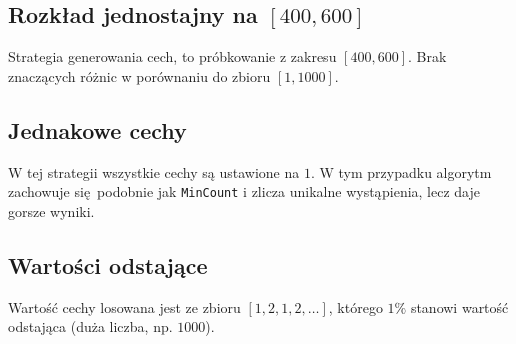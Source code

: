 \documentclass[a4paper,11pt]{article}
\theoremstyle{mytheor}
\begin{document}
\subsection*{Rozkład jednostajny na $[400, 600]$}
Strategia generowania cech, to próbkowanie z zakresu $[400, 600]$. Brak znaczących różnic w porównaniu do zbioru $[1, 1000]$.


\subsection*{Jednakowe cechy}
W tej strategii wszystkie cechy są ustawione na $1$. W tym przypadku algorytm zachowuje się podobnie jak \texttt{MinCount} i zlicza unikalne wystąpienia, lecz daje gorsze wyniki.


\subsection*{Wartości odstające}
Wartość cechy losowana jest ze zbioru $[1,2,1,2,\ldots]$, którego $1\%$ stanowi wartość odstająca (duża liczba, np. $1000$).

\end{document}
